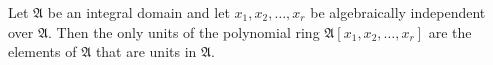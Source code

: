 Let $\mathfrak{A}$ be an integral domain and let $x_1, x_2, \dots, x_r$ be algebraically independent over $\mathfrak{A}$. Then the only units of the polynomial ring $\mathfrak{A}[x_1, x_2, \dots, x_r]$ are the elements of $\mathfrak{A}$ that are units in $\mathfrak{A}$.
